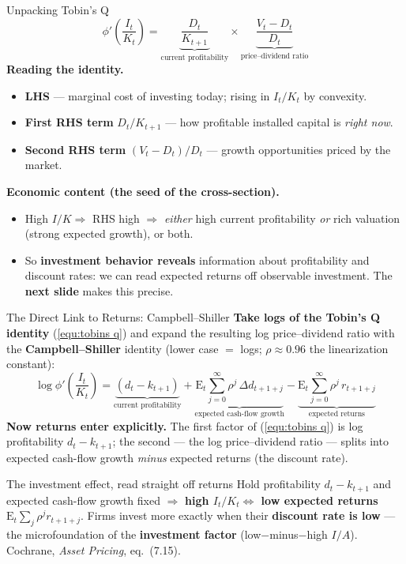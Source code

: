 \documentclass{beamer}
\begin{document}
\begin{frame}{Unpacking Tobin's Q}
	\begin{equation*}
		\phi'\!\left(\frac{I_t}{K_t}\right)=\underbrace{\frac{D_t}{K_{t+1}}}_{\text{current profitability}}\times\underbrace{\frac{V_t-D_t}{D_t}}_{\text{price--dividend ratio}}
	\end{equation*}
	\textbf{Reading the identity.}
	\begin{itemize}
		\item \textbf{LHS} --- marginal cost of investing today; rising in $I_t/K_t$ by convexity.
		\item \textbf{First RHS term} $D_t/K_{t+1}$ --- how profitable installed capital is \textit{right now}.
		\item \textbf{Second RHS term} $(V_t-D_t)/D_t$ --- growth opportunities priced by the market.
	\end{itemize}
	\vspace{2pt}
	\textbf{Economic content (the seed of the cross-section).}
	\begin{itemize}
		\item High $I/K \Rightarrow$ RHS high $\Rightarrow$ \textit{either} high current profitability \textit{or} rich valuation (strong expected growth), or both.
		\item So \textbf{investment behavior reveals} information about profitability and discount rates: we can read expected returns off observable investment. The \textbf{next slide} makes this precise.
	\end{itemize}
\end{frame}

\begin{frame}{The Direct Link to Returns: Campbell--Shiller}
	\textbf{Take logs of the Tobin's Q identity} (\ref{equ:tobins q}) and expand the resulting log price--dividend ratio with the \textbf{Campbell--Shiller} identity (lower case $=$ logs; $\rho\approx0.96$ the linearization constant):
	\begin{equation}\label{equ:cs link}
		\boxed{
		\log\phi'\!\left(\frac{I_t}{K_t}\right)
		=\underbrace{(d_t-k_{t+1})}_{\text{current profitability}}
		+\underbrace{\mathrm{E}_t\!\sum_{j=0}^{\infty}\rho^{j}\,\Delta d_{t+1+j}}_{\text{expected cash-flow growth}}
		-\underbrace{\mathrm{E}_t\!\sum_{j=0}^{\infty}\rho^{j}\,r_{t+1+j}}_{\text{expected returns}}
		}
	\end{equation}
	\textbf{Now returns enter explicitly.} The first factor of (\ref{equ:tobins q}) is log profitability $d_t-k_{t+1}$; the second --- the log price--dividend ratio --- splits into expected cash-flow growth \textit{minus} expected returns (the discount rate).
	\begin{block}{The investment effect, read straight off returns}
		Hold profitability $d_t-k_{t+1}$ and expected cash-flow growth fixed $\Rightarrow$
		\textbf{high $I_t/K_t \Leftrightarrow$ low expected returns} $\mathrm{E}_t\sum_{j}\rho^{j}r_{t+1+j}$.
		Firms invest more exactly when their \textbf{discount rate is low} --- the microfoundation of the \textbf{investment factor} (low$-$minus$-$high $I/A$). \hfill{\footnotesize Cochrane, \textit{Asset Pricing}, eq.~(7.15).}
	\end{block}
\end{frame}
\end{document}
